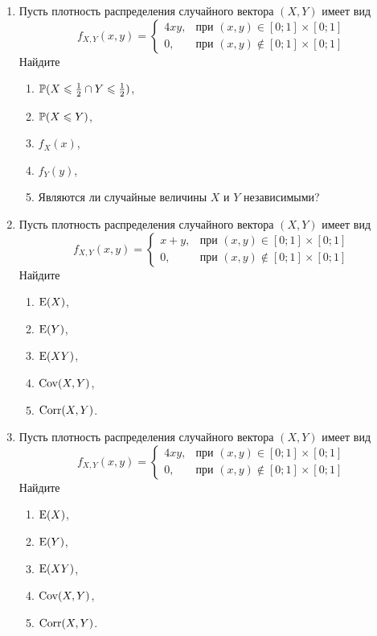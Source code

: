 \begin{enumerate}
\item Пусть плотность распределения случайного вектора $(X,Y)$ имеет вид
\[
f_{X,Y}(x,y) =
\begin{cases} 4xy, & \text{при } (x,y) \in [0;1] \times [0;1] \\
0 , & \text{при } (x,y) \not\in [0;1] \times [0;1]
\end{cases}
\]
Найдите
\begin{enumerate}
\item $\P(X \leq \frac{1}{2} \cap Y \leq \frac{1}{2})$,
\item $\P(X\leq Y)$,
\item $f_{X}(x)$,
\item $f_{Y}(y)$,
\item Являются ли случайные величины $X$ и $Y$ независимыми?
\end{enumerate}

\item Пусть плотность распределения случайного вектора $(X,Y)$ имеет вид
\[
f_{X,Y}(x,y) =
\begin{cases} x+y, & \text{при } (x,y) \in [0;1] \times [0;1] \\
0 , & \text{при } (x,y) \not\in [0;1] \times [0;1]
\end{cases}
\]
Найдите
\begin{enumerate}
\item $\E(X)$,
\item $\E(Y)$,
\item $\E(XY)$,
\item $\Cov(X,Y)$,
\item $\Corr(X,Y)$.
\end{enumerate}

\item Пусть плотность распределения случайного вектора $(X,Y)$ имеет вид
\[
f_{X,Y}(x,y) =
\begin{cases}
4xy, & \text{при } (x,y) \in [0;1] \times [0;1] \\
0 , & \text{при } (x,y) \not\in [0;1] \times [0;1]
\end{cases}
\]
Найдите
\begin{enumerate}
\item $\E(X)$,
\item $\E(Y)$,
\item $\E(XY)$,
\item $\Cov(X,Y)$,
\item $\Corr(X,Y)$.
\end{enumerate}


\end{enumerate}
